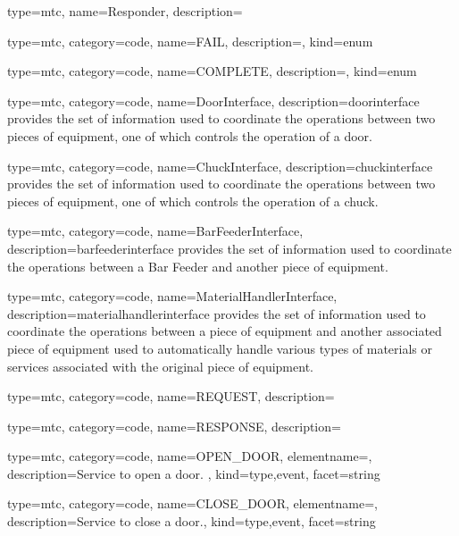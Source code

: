 {
  type=mtc,
  name={Responder},
  description={}
}


{
  type=mtc,
  category=code,
  name={FAIL},
  description={},
  kind={enum}
}


{
  type=mtc,
  category=code,
  name={COMPLETE},
  description={},
  kind={enum}
}


{
  type=mtc,
  category=code,
  name={DoorInterface},
  description={\gls{doorinterface} provides the set of information used to coordinate the operations between two pieces of equipment, one of which controls the operation of a door. }
}


{
  type=mtc,
  category=code,
  name={ChuckInterface},
  description={\gls{chuckinterface} provides the set of information used to coordinate the operations between two pieces of equipment, one of which controls the operation of a chuck.  }
}


{
  type=mtc,
  category=code,
  name={BarFeederInterface},
  description={\gls{barfeederinterface} provides the set of information used to coordinate the operations between a Bar Feeder and another piece of equipment.  }
}


{
  type=mtc,
  category=code,
  name={MaterialHandlerInterface},
  description={\gls{materialhandlerinterface} provides the set of information used to coordinate the operations between a piece of equipment and another associated piece of equipment used to automatically handle various types of materials or services associated with the original piece of equipment. }
}


{
  type=mtc,
  category=code,
  name={REQUEST},
  description={}
}


{
  type=mtc,
  category=code,
  name={RESPONSE},
  description={}
}


{
  type=mtc,
  category=code,
  name={OPEN\_DOOR},
  elementname=,
  description={Service to open a door. },
  kind={type,event},
  facet={\gls{string}}
}


{
  type=mtc,
  category=code,
  name={CLOSE\_DOOR},
  elementname=,
  description={Service to close a door.},
  kind={type,event},
  facet={\gls{string}}
}


